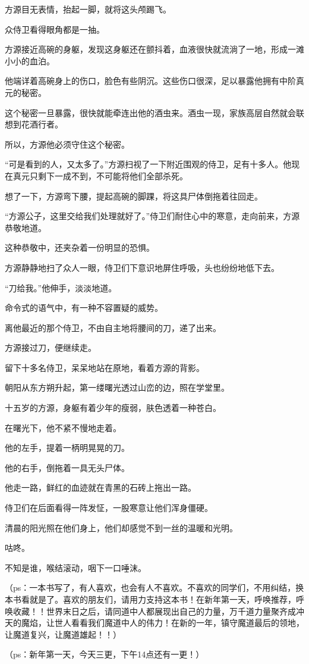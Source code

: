 \begin{this_body}
方源目无表情，抬起一脚，就将这头颅踢飞。

众侍卫看得眼角都是一抽。

方源接近高碗的身躯，发现这身躯还在颤抖着，血液很快就流淌了一地，形成一滩小小的血泊。

他端详着高碗身上的伤口，脸色有些阴沉。这些伤口很深，足以暴露他拥有中阶真元的秘密。

这个秘密一旦暴露，很快就能牵连出他的酒虫来。酒虫一现，家族高层自然就会联想到花酒行者。

所以，方源他必须守住这个秘密。

“可是看到的人，又太多了。”方源扫视了一下附近围观的侍卫，足有十多人。他现在真元只剩下一成不到，不可能将他们全部杀死。

想了一下，方源弯下腰，提起高碗的脚踝，将这具尸体倒拖着往回走。

“方源公子，这里交给我们处理就好了。”侍卫们耐住心中的寒意，走向前来，方源恭敬地道。

这种恭敬中，还夹杂着一份明显的恐惧。

方源静静地扫了众人一眼，侍卫们下意识地屏住呼吸，头也纷纷地低下去。

“刀给我。”他伸手，淡淡地道。

命令式的语气中，有一种不容置疑的威势。

离他最近的那个侍卫，不由自主地将腰间的刀，递了出来。

方源接过刀，便继续走。

留下十多名侍卫，呆呆地站在原地，看着方源的背影。

朝阳从东方朔升起，第一缕曙光透过山峦的边，照在学堂里。

十五岁的方源，身躯有着少年的瘦弱，肤色透着一种苍白。

在曙光下，他不紧不慢地走着。

他的左手，提着一柄明晃晃的刀。

他的右手，倒拖着一具无头尸体。

他走一路，鲜红的血迹就在青黑的石砖上拖出一路。

侍卫们在后面看得一阵发怔，一股寒意让他们浑身僵硬。

清晨的阳光照在他们身上，他们却感觉不到一丝的温暖和光明。

咕咚。

不知是谁，喉结滚动，咽下一口唾沫。

（ps：一本书写了，有人喜欢，也会有人不喜欢。不喜欢的同学们，不用纠结，换本书看就是了。喜欢的朋友们，请用力支持这本书！在新年第一天，呼唤推荐，呼唤收藏！！世界末日之后，请同道中人都展现出自己的力量，万千道力量聚齐成冲天的魔焰，让世人看看我们魔道中人的伟力！在新的一年，镇守魔道最后的领地，让魔道复兴，让魔道雄起！！）

（ps：新年第一天，今天三更，下午14点还有一更！）

\end{this_body}


